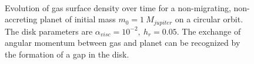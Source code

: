     \\
    \begin{figure}[h!]
      \centering
      \begin{minipage}{.3\linewidth}
        \centering
      \end{minipage}%
      \begin{minipage}{.3\linewidth}
        \centering
      \end{minipage}%
      \begin{minipage}{.3\linewidth}
        \centering
      \end{minipage}
      \caption{
        Evolution of gas surface density over time for a non-migrating,
        non-accreting planet of initial mass $m_0=1\ M_{jupiter}$ 
        on a circular orbit. The disk parameters are 
        $\alpha_{visc}=10^{-2},\ h_r=0.05$. 
        The exchange of angular momentum between gas and planet can be 
        recognized by the formation of a gap in the disk.
      }
      \label{fig:first_runs_0}
    \end{figure}

